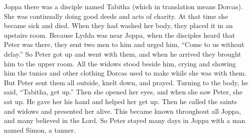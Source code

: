 {Joppa
there was
a disciple
named
Tabitha
(which
in translation
means
Dorcas). She
was
continually
doing
good
deeds
and
acts of charity.
At
that
time
she became
sick
and died.
When
they had washed
her body,
they placed
it in
an upstairs room.
Because Lydda
was
near
Joppa,
when
the disciples
heard
that
Peter
was
there,
they sent
two
men
to
him
and urged
him, “Come
to
us
without
delay.”
So
Peter
got up
and went with
them,
and when
he arrived
they brought
him to
the upper room.
All
the widows
stood beside
him,
crying
and
showing
him the tunics
and
other clothing
Dorcas
used to make
while
she was
with
them.
But
Peter
sent
them all
outside,
knelt down,
and
prayed.
Turning
to
the body,
he said,
“Tabitha,
get up.”
Then
she opened
her
eyes,
and
when
she saw
Peter,
she sat up.
He gave
her
his hand
and helped
her
get up.
Then
he called
the saints
and
widows
and presented
her
alive.
This became
known
throughout
all
Joppa,
and
many
believed
in
the Lord.
So
Peter stayed
many
days
in
Joppa
with
a man
named Simon,
a tanner.

}
